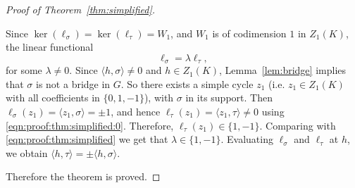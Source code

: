 \documentclass[11pt]{amsart}
\theoremstyle{theorem}
\theoremstyle{remark}
\theoremstyle{definition}
\newcommand {\la}   {{\langle}}
\newcommand {\ra}   {{\rangle}}
\begin{document}
\begin{proof}[Proof of Theorem~\ref{thm:simplified}]
\begin{enumerate}
Since $\operatorname{ker}(\ell_\sigma) = \operatorname{ker}(\ell_\tau) = W_1$,
and $W_1$ is of codimension $1$ in $Z_1(K)$, the linear functional 
\begin{equation}
\label{eqn:proof:thm:simplified}
\ell_\sigma = \lambda \ell_\tau,
\end{equation}
for some $\lambda \neq 0$. 
Since $\la h, \sigma \ra \neq 0$ and $h \in Z_1(K)$, Lemma~\ref{lem:bridge} implies that $\sigma$ is not a bridge in $G$. So there exists a simple cycle $z_1$
(i.e.
$z_1 \in Z_1(K)$ with all coefficients in $\{0,1,-1\}$), with $\sigma$ in its support. Then 
$\ell_\sigma(z_1) = \la z_1,\sigma\ra = \pm 1$, and hence $\ell_\tau(z_1) = \la z_1,\tau\ra  \neq 0$ using \eqref{eqn:proof:thm:simplified:0}. Therefore,
$\ell_\tau(z_1) \in \{1,-1\}$. 
Comparing with \eqref{eqn:proof:thm:simplified} we get that $\lambda \in \{1,-1\}$.
Evaluating $\ell_\sigma$ and $\ell_\tau$ at $h$, we obtain
$\la h, \tau\ra = \pm \la h, \sigma\ra$.
\end{enumerate}
Therefore the theorem is proved.
\end{proof}
\end{document}
